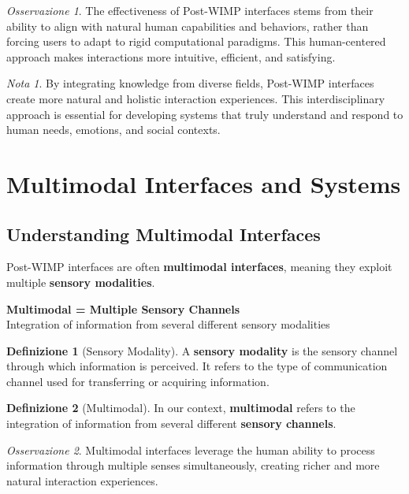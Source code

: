 \documentclass[11pt,a4paper]{article}
\theoremstyle{definition}
\newtheorem{definition}{Definizione}[section]
\theoremstyle{plain}
\theoremstyle{remark}
\newtheorem*{remark}{Nota}
\newtheorem*{observation}{Osservazione}
\begin{document}
\begin{observation}
The effectiveness of Post-WIMP interfaces stems from their ability to align with natural human capabilities and behaviors, rather than forcing users to adapt to rigid computational paradigms. This human-centered approach makes interactions more intuitive, efficient, and satisfying.
\end{observation}

\begin{remark}
By integrating knowledge from diverse fields, Post-WIMP interfaces create more natural and holistic interaction experiences. This interdisciplinary approach is essential for developing systems that truly understand and respond to human needs, emotions, and social contexts.
\end{remark}

\section{Multimodal Interfaces and Systems}

\subsection{Understanding Multimodal Interfaces}

Post-WIMP interfaces are often \textbf{multimodal interfaces}, meaning they exploit multiple \textbf{sensory modalities}.

\begin{center}
\colorbox{purple!15}{\parbox{0.85\textwidth}{
\centering
\textbf{Multimodal = Multiple Sensory Channels}\\[0.2cm]
Integration of information from several different sensory modalities
}}
\end{center}

\begin{definition}[Sensory Modality]
A \textbf{sensory modality} is the sensory channel through which information is perceived. It refers to the type of communication channel used for transferring or acquiring information.
\end{definition}

\begin{definition}[Multimodal]
In our context, \textbf{multimodal} refers to the integration of information from several different \textbf{sensory channels}.
\end{definition}

\begin{observation}
Multimodal interfaces leverage the human ability to process information through multiple senses simultaneously, creating richer and more natural interaction experiences.
\end{observation}
\end{document}
